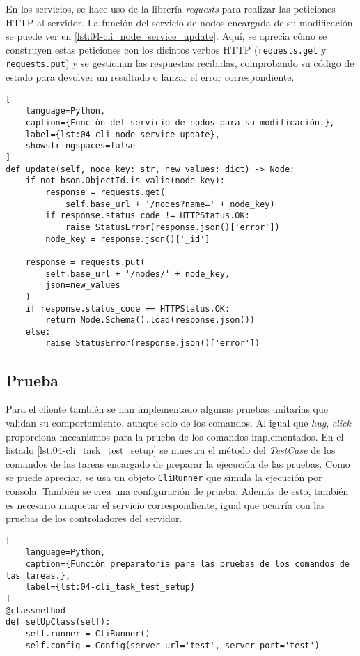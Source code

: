 En los servicios, se hace uso de la librería \textit{requests} para realizar las
peticiones HTTP al servidor. La función del servicio de nodos encargada de su
modificación se puede ver en \ref{lst:04-cli_node_service_update}. Aquí, se
aprecia cómo se construyen estas peticiones con los disintos verbos HTTP
(\texttt{requests.get} y \texttt{requests.put}) y se gestionan las respuestas
recibidas, comprobando su código de estado para devolver un resultado o lanzar
el error correspondiente.

\begin{lstlisting}[
    language=Python,
    caption={Función del servicio de nodos para su modificación.},
    label={lst:04-cli_node_service_update},
    showstringspaces=false
]
def update(self, node_key: str, new_values: dict) -> Node:
    if not bson.ObjectId.is_valid(node_key):
        response = requests.get(
            self.base_url + '/nodes?name=' + node_key)
        if response.status_code != HTTPStatus.OK:
            raise StatusError(response.json()['error'])
        node_key = response.json()['_id']

    response = requests.put(
        self.base_url + '/nodes/' + node_key,
        json=new_values
    )
    if response.status_code == HTTPStatus.OK:
        return Node.Schema().load(response.json())
    else:
        raise StatusError(response.json()['error'])
\end{lstlisting}

\subsection{Prueba}

Para el cliente también se han implementado algunas pruebas unitarias que
validan su comportamiento, aunque solo de los comandos. Al igual que
\textit{hug}, \textit{click} proporciona mecanismos para la prueba de los
comandos implementados. En el listado \ref{lst:04-cli_task_test_setup} se
muestra el método del \textit{TestCase} de los comandos de las tareas encargado
de preparar la ejecución de las pruebas. Como se puede apreciar, se usa un
objeto \texttt{CliRunner} que simula la ejecución por consola. También se crea
una configuración de prueba. Además de esto, también es necesario maquetar el
servicio correspondiente, igual que ocurría con las pruebas de los controladores
del servidor.

\begin{lstlisting}[
    language=Python,
    caption={Función preparatoria para las pruebas de los comandos de las tareas.},
    label={lst:04-cli_task_test_setup}
]
@classmethod
def setUpClass(self):
    self.runner = CliRunner()
    self.config = Config(server_url='test', server_port='test')
\end{lstlisting}

